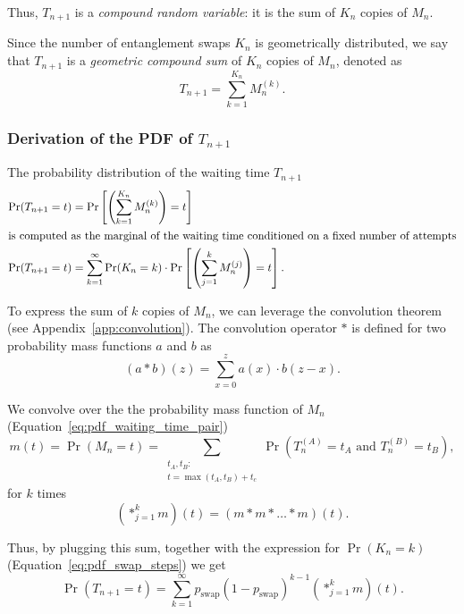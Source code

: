 \documentclass{masterthesis}
\begin{document}
Thus, $T_{n+1}$ is a \textit{compound random variable}: it is the sum of $K_n$ copies of $M_n$. 

Since the number of entanglement swaps $K_n$ is geometrically distributed, we say that $T_{n+1}$ is a \textit{geometric compound sum} of $K_n$ copies of $M_n$, denoted as
\begin{equation}
    T_{n+1}=\sum_{k=1}^{K_{n}} M_{n}^{(k)} .
\end{equation}

\subsubsection*{Derivation of the PDF of $T_{n+1}$}

The probability distribution of the waiting time $T_{n+1}$
\begin{align}
    \Pr(T_{n+1} = t) &= \Pr\left[\left(\sum_{k=1}^{K_{n}} M_{n}^{(k)}\right) = t\right] \nonumber \\
    \intertext{is computed as the marginal of the waiting time conditioned on a fixed number of attempts}
    \Pr(T_{n+1} = t) &= \sum_{k=1}^{\infty} \Pr(K_{n} = k) \cdot \Pr\left[\left( \sum_{j=1}^{k} M_{n}^{(j)} \right) = t\right].
\end{align}

To express the sum of $k$ copies of $M_n$, we can leverage the convolution theorem (see Appendix~\ref{app:convolution}).
The convolution operator $\ast$ is defined for two probability mass functions $a$ and $b$ as
\begin{equation}
    (a \ast b)(z) = \sum_{x=0}^{z} a(x) \cdot b(z-x) .
\end{equation}


We convolve over the the probability mass function of $M_n$ (Equation~\ref{eq:pdf_waiting_time_pair})
\begin{equation}\label{eq:pdf_waiting_time_pair_convolution}
    m(t) = \Pr(M_n = t) = \sum_{\substack{t_A, t_B: \\ t = \max(t_A, t_B) + t_c}} \Pr(T_n^{(A)} = t_A \text{ and } T_n^{(B)} = t_B) ,
\end{equation}
for $k$ times
\begin{equation}
    \left( \ast_{j=1}^{k} m \right)(t) = \left( m \ast m \ast \ldots \ast m \right)(t) .
\end{equation}

Thus, by plugging this sum, together with the expression for $\Pr(K_n = k)$ (Equation~\ref{eq:pdf_swap_steps}) we get
\begin{equation}\label{eq:waiting_time_swap}
    \Pr(T_{n+1} = t) = \sum_{k=1}^{\infty} p_{\text{swap}}{(1 - p_{\text{swap}})}^{k-1} \left( \ast_{j=1}^{k} m \right) (t) .
\end{equation}
\end{document}
